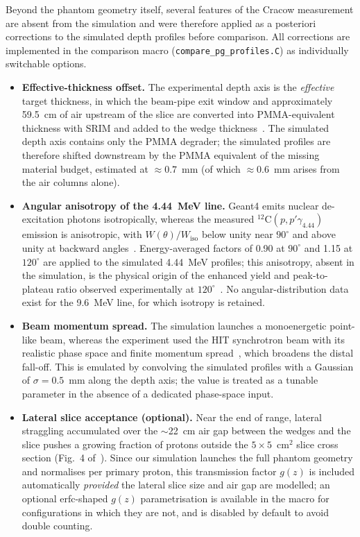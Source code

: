 \documentclass[a4paper]{article}
\begin{document}
Beyond the phantom geometry itself, several features of the Cracow measurement are absent from the simulation and were therefore applied as a posteriori corrections to the simulated depth profiles before comparison. All corrections are implemented in the comparison macro (\texttt{compare\_pg\_profiles.C}) as individually switchable options.

\begin{itemize}
    \item \textbf{Effective-thickness offset.} The experimental depth axis is the \emph{effective} target thickness, in which the beam-pipe exit window and approximately 59.5~cm of air upstream of the slice are converted into PMMA-equivalent thickness with SRIM and added to the wedge thickness~\cite{kelleter2017}. The simulated depth axis contains only the PMMA degrader; the simulated profiles are therefore shifted downstream by the PMMA equivalent of the missing material budget, estimated at $\approx 0.7$~mm (of which $\approx 0.6$~mm arises from the air columns alone). %
    \item \textbf{Angular anisotropy of the 4.44~MeV line.} Geant4 emits nuclear de-excitation photons isotropically, whereas the measured $^{12}$C$(p,p'\gamma_{4.44})$ emission is anisotropic, with $W(\theta)/W_\mathrm{iso}$ below unity near $90^\circ$ and above unity at backward angles~\cite{kiener1998}. Energy-averaged factors of 0.90 at $90^\circ$ and 1.15 at $120^\circ$ are applied to the simulated 4.44~MeV profiles; this anisotropy, absent in the simulation, is the physical origin of the enhanced yield and peak-to-plateau ratio observed experimentally at $120^\circ$~\cite{kelleter2017}. No angular-distribution data exist for the 9.6~MeV line, for which isotropy is retained.
    \item \textbf{Beam momentum spread.} The simulation launches a monoenergetic point-like beam, whereas the experiment used the HIT synchrotron beam with its realistic phase space and finite momentum spread~\cite{kelleter2017}, which broadens the distal fall-off. This is emulated by convolving the simulated profiles with a Gaussian of $\sigma = 0.5$~mm along the depth axis; the value is treated as a tunable parameter in the absence of a dedicated phase-space input. %
    \item \textbf{Lateral slice acceptance (optional).} Near the end of range, lateral straggling accumulated over the $\sim$22~cm air gap between the wedges and the slice pushes a growing fraction of protons outside the $5\times5$~cm$^2$ slice cross section (Fig.~4 of~\cite{kelleter2017}). Since our simulation launches the full phantom geometry and normalises per primary proton, this transmission factor $g(z)$ is included automatically \emph{provided} the lateral slice size and air gap are modelled; an optional erfc-shaped $g(z)$ parametrisation is available in the macro for configurations in which they are not, and is disabled by default to avoid double counting.
\end{itemize}
\end{document}
